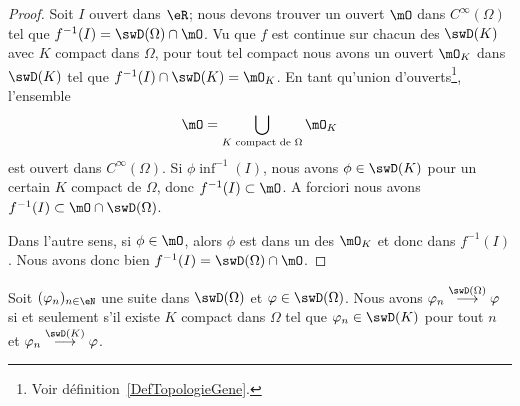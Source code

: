 \begin{proof}
    Soit \( I\) ouvert dans \( \eR\); nous devons trouver un ouvert \( \mO\) dans \(  C^{\infty}(\Omega)\) tel que \( f^{-1}(I)=\swD(\Omega)\cap\mO\). Vu que \( f\) est continue sur chacun des \( \swD(K)\) avec \( K\) compact dans \( \Omega\), pour tout tel compact nous avons un ouvert \( \mO_K\) dans \( \swD(K)\) tel que \( f^{-1}(I)\cap \swD(K)=\mO_K\). En tant qu'union d'ouverts\footnote{Voir définition~\ref{DefTopologieGene}.}, l'ensemble
    \begin{equation}
        \mO=\bigcup_{ K\text{ compact de } \Omega}\mO_K
    \end{equation}
    est ouvert dans \(  C^{\infty}(\Omega)\). Si \( \phi\inf^{-1}(I)\), nous avons \( \phi\in\swD(K)\) pour un certain \( K\) compact de \( \Omega\), donc \( f^{-1}(I)\subset\mO\). A forciori nous avons \( f^{-1}(I)\subset\mO\cap\swD(\Omega)\).

    Dans l'autre sens, si \( \phi\in\mO\), alors \( \phi\) est dans un des \( \mO_K\) et donc dans \( f^{-1}(I)\). Nous avons donc bien \( f^{-1}(I)=\swD(\Omega)\cap \mO\).
\end{proof}

\begin{theorem}       \label{ThoXYADBZr}
    Soit \( (\varphi_n)_{n\in \eN}\) une suite dans \( \swD(\Omega)\) et \( \varphi\in\swD(\Omega)\). Nous avons \( \varphi_n\stackrel{\swD(\Omega)}{\longrightarrow}\varphi\) si et seulement s'il existe \( K\) compact dans \( \Omega\) tel que \( \varphi_n\in\swD(K)\) pour tout \( n\) et \( \varphi_n\stackrel{\swD(K)}{\longrightarrow}\varphi\).
\end{theorem}

